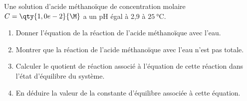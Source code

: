 Une solution d'acide méthanoïque de concentration molaire $C=\qty{1,0e-2}{\M}$ a
un pH égal à 2,9 à $\qty{25}{\degreeCelsius}$.
\begin{enumerate}
    \item Donner l'équation de la réaction de l'acide méthanoïque avec l'eau.
    \item Montrer que la réaction de l'acide méthanoïque avec l'eau n'est pas
          totale.
    \item Calculer le quotient de réaction associé à l'équation de cette
          réaction dans l'état d'équilibre du système.
    \item En déduire la valeur de la constante d'équilibre associée à cette
          équation.
\end{enumerate}

